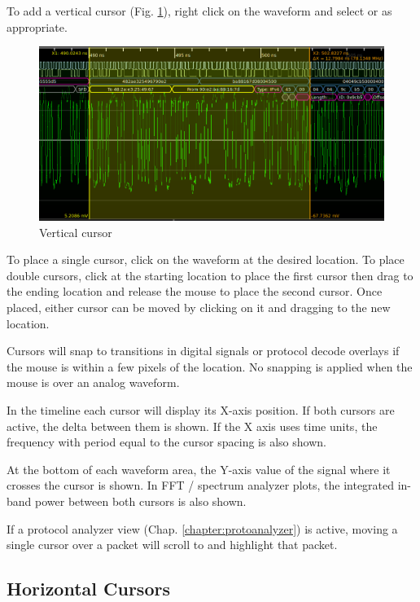 To add a vertical cursor (Fig. \ref{vertical-cursor}), right click on the waveform and select  or  as appropriate.

\begin{figure}[H]
\centering
\includegraphics[width=13cm]{images/vertical-cursor.png}
\caption{Vertical cursor}
\label{vertical-cursor}
\end{figure}

To place a single cursor, click on the waveform at the desired location. To place double cursors, click at the starting
location to place the first cursor then drag to the ending location and release the mouse to place the second cursor.
Once placed, either cursor can be moved by clicking on it and dragging to the new location.

Cursors will snap to transitions in digital signals or protocol decode overlays if the mouse is within a few pixels of
the location. No snapping is applied when the mouse is over an analog waveform.

In the timeline each cursor will display its X-axis position. If both cursors are active, the delta between them
is shown. If the X axis uses time units, the frequency with period equal to the cursor spacing is also shown.

At the bottom of each waveform area, the Y-axis value of the signal where it crosses the cursor is shown. In FFT /
spectrum analyzer plots, the integrated in-band power between both cursors is also shown.

If a protocol analyzer view (Chap. \ref{chapter:protoanalyzer}) is active, moving a single cursor over a packet will
scroll to and highlight that packet.

\subsection{Horizontal Cursors}

